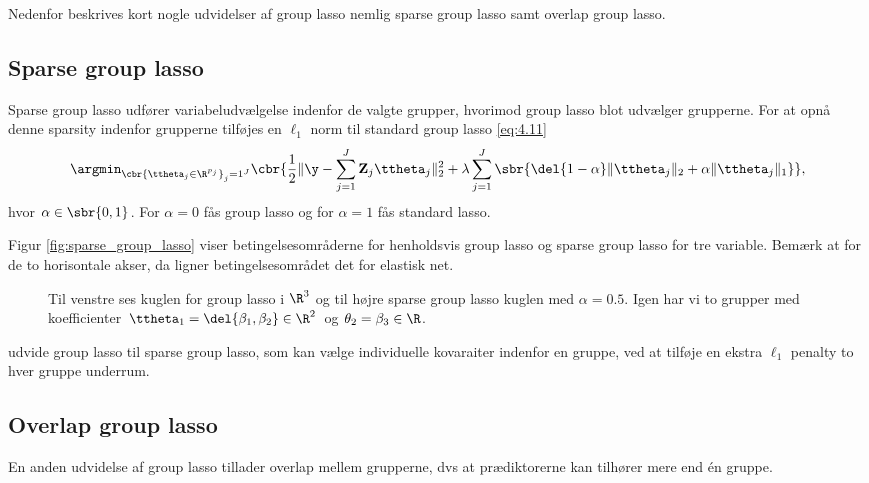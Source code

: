 Nedenfor beskrives kort nogle udvidelser af group lasso nemlig sparse group lasso samt overlap group lasso.
%
\subsection{Sparse group lasso}
Sparse group lasso udfører variabeludvælgelse indenfor de valgte grupper, hvorimod group lasso blot udvælger grupperne.
For at opnå denne sparsity indenfor grupperne tilføjes en \(\ell_1\) norm til standard group lasso \eqref{eq:4.11} 
\begin{align*}
\argmin_{\cbr{\ttheta_j \in \R^{p_j}}_j=1^J} \cbr{\frac{1}{2} \Vert \y - \sum_{j=1}^J \mathbf{Z}_{j} \ttheta_j \Vert_2^2 + \lambda \sum_{j=1}^J \sbr{ \del{1-\alpha} \Vert \ttheta_j \Vert_2 + \alpha \Vert \ttheta_j \Vert_1}},
\end{align*}
hvor \(\alpha \in \sbr{0,1}\).
For \(\alpha = 0 \) fås group lasso og for \(\alpha = 1\) fås standard lasso.

Figur \ref{fig:sparse_group_lasso} viser betingelsesområderne for henholdsvis group lasso og sparse group lasso for tre variable.
Bemærk at for de to horisontale akser, da ligner betingelsesområdet det for elastisk net.
%
\begin{figure}[H]
\centering
\caption{Til venstre ses kuglen for group lasso i \(\R^3\) og til højre sparse group lasso kuglen med \(\alpha = 0.5\).
Igen har vi to grupper med koefficienter \(\ttheta_1 = \del{\beta_1, \beta_2} \in \R^2\) og \(\theta_2 = \beta_3 \in \R\).}
\label{fig:group_lasso}
\end{figure}
%



udvide group lasso til sparse group lasso, som kan vælge individuelle kovaraiter indenfor en gruppe, ved at tilføje en ekstra \(\ell_1\) penalty to hver gruppe underrum.


\subsection{Overlap group lasso}
En anden udvidelse af group lasso tillader overlap mellem grupperne, dvs at prædiktorerne kan tilhører mere end én gruppe.

\newpage